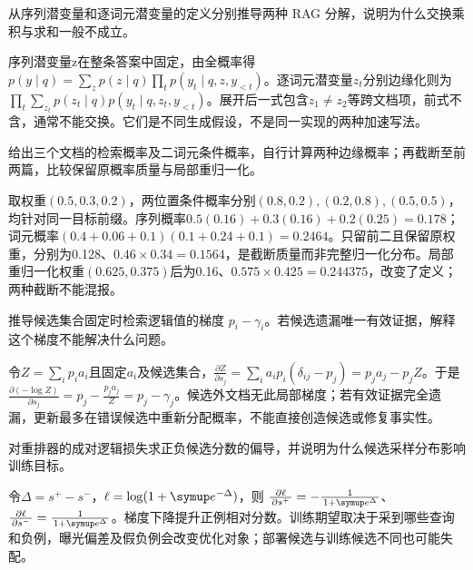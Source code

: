 
\begin{exercises}
\begin{exercise} 从序列潜变量和逐词元潜变量的定义分别推导两种 RAG 分解，说明为什么交换乘积与求和一般不成立。

\begin{solution}
序列潜变量z在整条答案中固定，由全概率得 $p(y\mid q)=\sum_zp(z\mid q)\prod_t p(y_t\mid q,z,y_{<t})$。逐词元潜变量$z_t$分别边缘化则为 $\prod_t\sum_{z_t}p(z_t\mid q)p(y_t\mid q,z_t,y_{<t})$。展开后一式包含$z_1\ne z_2$等跨文档项，前式不含，通常不能交换。它们是不同生成假设，不是同一实现的两种加速写法。
\end{solution}
\end{exercise}

\begin{exercise} 给出三个文档的检索概率及二词元条件概率，自行计算两种边缘概率；再截断至前两篇，比较保留原概率质量与局部重归一化。

\begin{solution}
取权重$(0.5,0.3,0.2)$，两位置条件概率分别$(0.8,0.2),(0.2,0.8),(0.5,0.5)$，均针对同一目标前缀。序列概率$0.5(0.16)+0.3(0.16)+0.2(0.25)=0.178$；词元概率$(0.4+0.06+0.1)(0.1+0.24+0.1)=0.2464$。只留前二且保留原权重，分别为0.128、$0.46\times0.34=0.1564$，是截断质量而非完整归一化分布。局部重归一化权重$(0.625,0.375)$后为0.16、$0.575\times0.425=0.244375$，改变了定义；两种截断不能混报。
\end{solution}
\end{exercise}

\begin{exercise} 推导候选集合固定时检索逻辑值的梯度 $p_i-\gamma_i$。若候选遗漏唯一有效证据，解释这个梯度不能解决什么问题。

\begin{solution}
令$Z=\sum_i p_i a_i$且固定$a_i$及候选集合，$\frac{\partial Z}{\partial s_j}=\sum_i a_ip_i(\delta_{ij}-p_j)=p_ja_j-p_jZ$。于是 $\frac{\partial(-\log Z)}{\partial s_j}=p_j-\frac{p_ja_j}{Z}=p_j-\gamma_j$。候选外文档无此局部梯度；若有效证据完全遗漏，更新最多在错误候选中重新分配概率，不能直接创造候选或修复事实性。
\end{solution}
\end{exercise}

\begin{exercise} 对重排器的成对逻辑损失求正负候选分数的偏导，并说明为什么候选采样分布影响训练目标。

\begin{solution}
令$\Delta=s^+-s^-$，$\ell=\log(1+\conste{}^{-\Delta})$，则 $\frac{\partial\ell}{\partial s^+}=-\frac{1}{1+\conste{}^\Delta}$、$\frac{\partial\ell}{\partial s^-}=\frac{1}{1+\conste{}^\Delta}$。梯度下降提升正例相对分数。训练期望取决于采到哪些查询和负例，曝光偏差及假负例会改变优化对象；部署候选与训练候选不同也可能失配。
\end{solution}
\end{exercise}


\end{exercises}
